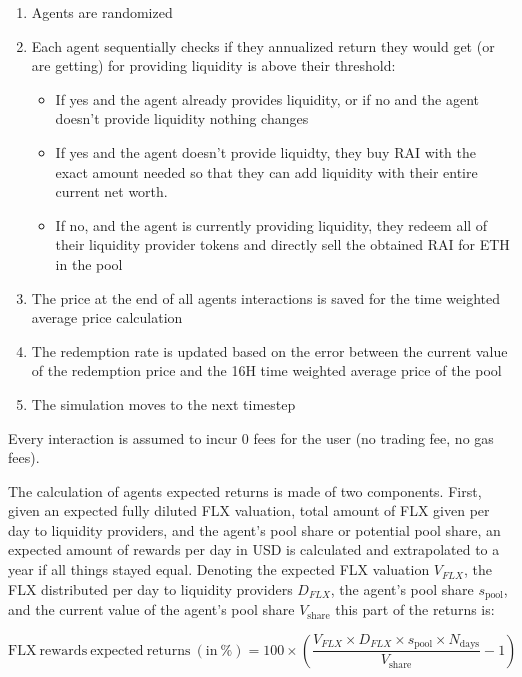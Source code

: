 \documentclass{article}
\begin{document}
    \begin{enumerate}
      \item Agents are randomized
      \item Each agent sequentially checks if they annualized return they would get (or are getting) for providing liquidity is above their threshold:
        \begin{itemize}
          \item If yes and the agent already provides liquidity, or if no and the agent doesn't provide liquidity nothing changes
          \item If yes and the agent doesn't provide liquidty, they buy RAI with the exact amount needed so that they can add liquidity with their entire current net worth. 
          \item If no, and the agent is currently providing liquidity, they redeem all of their liquidity provider tokens and directly sell the obtained RAI for ETH in the pool
        \end{itemize}
      \item The price at the end of all agents interactions is saved for the time weighted average price calculation
      \item The redemption rate is updated based on the error between the current value of the redemption price and the 16H time weighted average price of the pool
      \item The simulation moves to the next timestep
    \end{enumerate}
    
    Every interaction is assumed to incur 0 fees for the user (no trading fee, no gas fees).

    The calculation of agents expected returns is made of two components. First, given an expected fully diluted FLX valuation, total amount of FLX given per day to liquidity providers, and the agent's pool share or potential pool share, an expected amount of rewards per day in USD is calculated and extrapolated to a year if all things stayed equal. Denoting the expected FLX valuation $V_{FLX}$, the FLX distributed per day to liquidity providers $D_{FLX}$, the agent's pool share $s_{\mathrm{pool}}$, and the current value of the agent's pool share $V_{\mathrm{share}}$ this part of the returns is: 
    
    \begin{equation*}
      \mathrm{FLX \ rewards \ expected \ returns \ (in \ \%)} =  100 \times \left( \frac{V_{FLX} \times D_{FLX} \times s_{\mathrm{pool}} \times N_{\mathrm{days}}}{V_{\mathrm{share}}} - 1 \right)
    \end{equation*}
    
\end{document}
